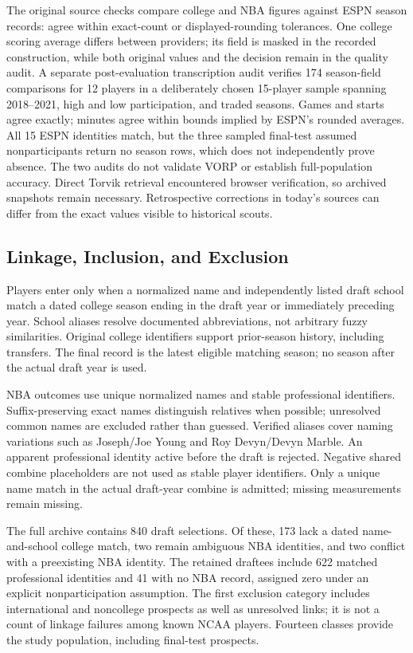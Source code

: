 \documentclass[11pt]{article}
\begin{document}
The original source checks compare \CheckN{} college and NBA figures against ESPN season records: \ValidCheckN{} agree within exact-count or displayed-rounding tolerances. One college scoring average differs between providers; its field is masked in the recorded construction, while both original values and the decision remain in the quality audit. A separate post-evaluation transcription audit verifies 174 season-field comparisons for 12 players in a deliberately chosen 15-player sample spanning 2018--2021, high and low participation, and traded seasons. Games and starts agree exactly; minutes agree within bounds implied by ESPN's rounded averages. All 15 ESPN identities match, but the three sampled final-test assumed nonparticipants return no season rows, which does not independently prove absence. The two audits do not validate VORP or establish full-population accuracy. Direct Torvik retrieval encountered browser verification, so archived snapshots remain necessary. Retrospective corrections in today's sources can differ from the exact values visible to historical scouts.

\subsection{Linkage, Inclusion, and Exclusion}
Players enter only when a normalized name and independently listed draft school match a dated college season ending in the draft year or immediately preceding year. School aliases resolve documented abbreviations, not arbitrary fuzzy similarities. Original college identifiers support prior-season history, including transfers. The final record is the latest eligible matching season; no season after the actual draft year is used.

NBA outcomes use unique normalized names and stable professional identifiers. Suffix-preserving exact names distinguish relatives when possible; unresolved common names are excluded rather than guessed. Verified aliases cover naming variations such as Joseph/Joe Young and Roy Devyn/Devyn Marble. An apparent professional identity active before the draft is rejected. Negative shared combine placeholders are not used as stable player identifiers. Only a unique name match in the actual draft-year combine is admitted; missing measurements remain missing.

The full archive contains 840 draft selections. Of these, 173 lack a dated name-and-school college match, two remain ambiguous NBA identities, and two conflict with a preexisting NBA identity. The retained \SampleN{} draftees include 622 matched professional identities and 41 with no NBA record, assigned zero under an explicit nonparticipation assumption. The first exclusion category includes international and noncollege prospects as well as unresolved links; it is not a count of linkage failures among known NCAA players. Fourteen classes provide the study population, including \TestN{} final-test prospects.
\end{document}
